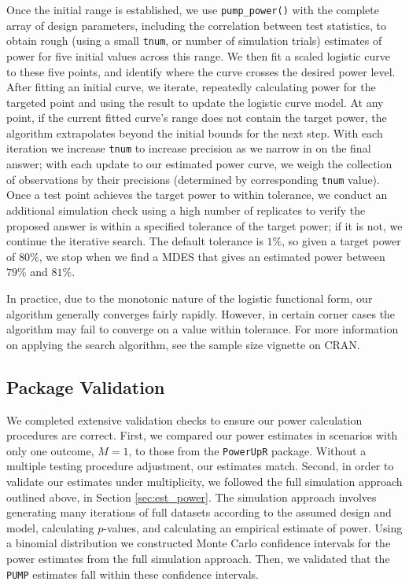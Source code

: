 \documentclass{article}
\begin{document}
Once the initial range is established, we use \texttt{pump\_power()}
with the complete array of design parameters, including the correlation
between test statistics, to obtain rough (using a small \texttt{tnum},
or number of simulation trials) estimates of power for five initial
values across this range. We then fit a scaled logistic curve to these
five points, and identify where the curve crosses the desired power
level. After fitting an initial curve, we iterate, repeatedly
calculating power for the targeted point and using the result to update
the logistic curve model. At any point, if the current fitted curve's
range does not contain the target power, the algorithm extrapolates
beyond the initial bounds for the next step. With each iteration we
increase \texttt{tnum} to increase precision as we narrow in on the
final answer; with each update to our estimated power curve, we weigh
the collection of observations by their precisions (determined by
corresponding \texttt{tnum} value). Once a test point achieves the
target power to within tolerance, we conduct an additional simulation
check using a high number of replicates to verify the proposed answer is
within a specified tolerance of the target power; if it is not, we
continue the iterative search. The default tolerance is \(1\%\), so
given a target power of \(80\%\), we stop when we find a MDES that gives
an estimated power between \(79\%\) and \(81\%\).

In practice, due to the monotonic nature of the logistic functional
form, our algorithm generally converges fairly rapidly. However, in
certain corner cases the algorithm may fail to converge on a value
within tolerance. For more information on applying the search algorithm,
see the sample size vignette on CRAN.

\subsection{Package Validation}

We completed extensive validation checks to ensure our power calculation
procedures are correct. First, we compared our power estimates in
scenarios with only one outcome, \(M = 1\), to those from the
\texttt{PowerUpR} package. Without a multiple testing procedure
adjustment, our estimates match. Second, in order to validate our
estimates under multiplicity, we followed the full simulation approach
outlined above, in Section \ref{sec:est_power}. The simulation approach
involves generating many iterations of full datasets according to the
assumed design and model, calculating \(p\)-values, and calculating an
empirical estimate of power. Using a binomial distribution we
constructed Monte Carlo confidence intervals for the power estimates
from the full simulation approach. Then, we validated that the
\texttt{PUMP} estimates fall within these confidence intervals.
\end{document}
